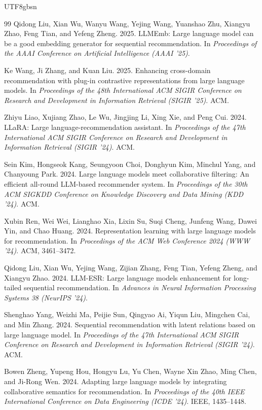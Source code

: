 \documentclass{article}
\begin{document}
\begin{CJK*}{UTF8}{gbsn}
\begin{thebibliography}{99}
Qidong Liu, Xian Wu, Wanyu Wang, Yejing Wang, Yuanshao Zhu, Xiangyu Zhao, Feng Tian, and Yefeng Zheng. 2025.
LLMEmb: Large language model can be a good embedding generator for sequential recommendation.
In \textit{Proceedings of the AAAI Conference on Artificial Intelligence (AAAI '25)}.

Ke Wang, Ji Zhang, and Kuan Liu. 2025.
Enhancing cross-domain recommendation with plug-in contrastive representations from large language models.
In \textit{Proceedings of the 48th International ACM SIGIR Conference on Research and Development in Information Retrieval (SIGIR '25)}. ACM.

Zhiyu Liao, Xujiang Zhao, Le Wu, Jingjing Li, Xing Xie, and Peng Cui. 2024.
LLaRA: Large language-recommendation assistant.
In \textit{Proceedings of the 47th International ACM SIGIR Conference on Research and Development in Information Retrieval (SIGIR '24)}. ACM.

Sein Kim, Hongseok Kang, Seungyoon Choi, Donghyun Kim, Minchul Yang, and Chanyoung Park. 2024.
Large language models meet collaborative filtering: An efficient all-round LLM-based recommender system.
In \textit{Proceedings of the 30th ACM SIGKDD Conference on Knowledge Discovery and Data Mining (KDD '24)}. ACM.

Xubin Ren, Wei Wei, Lianghao Xia, Lixin Su, Suqi Cheng, Junfeng Wang, Dawei Yin, and Chao Huang. 2024.
Representation learning with large language models for recommendation.
In \textit{Proceedings of the ACM Web Conference 2024 (WWW '24)}. ACM, 3461--3472.

Qidong Liu, Xian Wu, Yejing Wang, Zijian Zhang, Feng Tian, Yefeng Zheng, and Xiangyu Zhao. 2024.
LLM-ESR: Large language models enhancement for long-tailed sequential recommendation.
In \textit{Advances in Neural Information Processing Systems 38 (NeurIPS '24)}.

Shenghao Yang, Weizhi Ma, Peijie Sun, Qingyao Ai, Yiqun Liu, Mingchen Cai, and Min Zhang. 2024.
Sequential recommendation with latent relations based on large language model.
In \textit{Proceedings of the 47th International ACM SIGIR Conference on Research and Development in Information Retrieval (SIGIR '24)}. ACM.

Bowen Zheng, Yupeng Hou, Hongyu Lu, Yu Chen, Wayne Xin Zhao, Ming Chen, and Ji-Rong Wen. 2024.
Adapting large language models by integrating collaborative semantics for recommendation.
In \textit{Proceedings of the 40th IEEE International Conference on Data Engineering (ICDE '24)}. IEEE, 1435--1448.


\end{thebibliography}
\end{CJK*}
\end{document}
